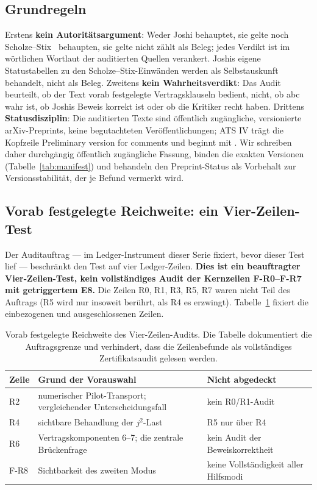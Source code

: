 \documentclass[11pt,a4paper]{article}
\begin{document}
\subsection{Grundregeln}

Erstens \textbf{kein Autoritätsargument}: Weder \glqq Joshi behauptet, sie gelte\grqq{}
noch \glqq Scholze--Stix~\cite{scholzestix} behaupten, sie gelte nicht\grqq{} zählt als
Beleg; jedes Verdikt ist im wörtlichen Wortlaut der auditierten Quellen
verankert. Joshis eigene Statustabellen zu den Scholze--Stix-Einwänden werden
als Selbstauskunft behandelt, nicht als Beleg. Zweitens \textbf{kein
Wahrheitsverdikt}: Das Audit beurteilt, ob der Text vorab festgelegte
Vertragsklauseln bedient, nicht, ob abc wahr ist, ob Joshis Beweis korrekt ist
oder ob die Kritiker recht haben. Drittens \textbf{Statusdisziplin}: Die
auditierten Texte sind öffentlich zugängliche, versionierte arXiv-Preprints,
keine begutachteten Veröffentlichungen; ATS IV trägt die Kopfzeile
\glqq Preliminary version for comments\grqq{} und beginnt mit \grqq{}. Wir schreiben daher durchgängig \glqq öffentlich zugängliche
Fassung\grqq{}, binden die exakten Versionen (Tabelle~\ref{tab:manifest}) und
behandeln den Preprint-Status als Vorbehalt zur Versionsstabilität, der je
Befund vermerkt wird.

\subsection{Vorab festgelegte Reichweite: ein Vier-Zeilen-Test}\label{sec:scope}

Der Auditauftrag --- im Ledger-Instrument dieser Serie fixiert, bevor dieser
Test lief --- beschränkt den Test auf vier Ledger-Zeilen. \textbf{Dies ist ein
beauftragter Vier-Zeilen-Test, kein vollständiges Audit der Kernzeilen
F-R0--F-R7 mit getriggertem E8.} Die Zeilen R0,
R1, R3, R5, R7 waren nicht Teil des Auftrags (R5 wird nur insoweit berührt, als
R4 es erzwingt). Tabelle~\ref{tab:audit-scope} fixiert die einbezogenen und
ausgeschlossenen Zeilen.

\begin{table}[htbp]
\centering\small
\setlength{\tabcolsep}{4pt}
\begin{tabularx}{\textwidth}{@{}l >{\raggedright\arraybackslash}X >{\raggedright\arraybackslash}p{5.5cm}@{}}
\toprule
Zeile & Grund der Vorauswahl & Nicht abgedeckt \\
\midrule
R2 & numerischer Pilot-Transport; vergleichender Unterscheidungsfall & kein R0/R1-Audit \\
R4 & sichtbare Behandlung der $j^2$-Last & R5 nur über R4 \\
R6 & Vertragskomponenten 6--7; die zentrale Brückenfrage & kein Audit der Beweiskorrektheit \\
F-R8 & Sichtbarkeit des zweiten Modus & keine Vollständigkeit aller Hilfsmodi \\
\bottomrule
\end{tabularx}
\caption{Vorab festgelegte Reichweite des Vier-Zeilen-Audits. Die Tabelle
dokumentiert die Auftragsgrenze und verhindert, dass die Zeilenbefunde als
vollständiges Zertifikatsaudit gelesen werden.}
\label{tab:audit-scope}
\end{table}
\end{document}
